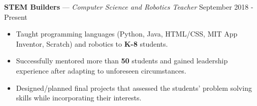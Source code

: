 \documentclass[11pt]{res}
\begin{document}
\begin{footnotesize}
\begin{resume}
\begin{itemize}[leftmargin=6.25mm]
\end{itemize}
\vspace{-2.5mm}
\textbf{STEM Builders} — {\sl Computer Science and Robotics Teacher} \hfill September 2018 - Present\vspace{-5mm}
\begin{itemize}[leftmargin=6.25mm] \itemsep -2pt 
\item Taught programming languages (Python, Java, HTML/CSS, MIT App Inventor, Scratch) and robotics to \textbf{K-8} students. 
\vspace{1mm}
\item Successfully mentored more than \textbf{50} students and gained leadership experience after adapting to unforeseen circumstances. 
\vspace{1mm}
\item Designed/planned final projects that assessed the students' problem solving skills while incorporating their interests.
\end{itemize}
\begin{small}

\end{small}
\end{resume}
\end{footnotesize}
\end{document}
